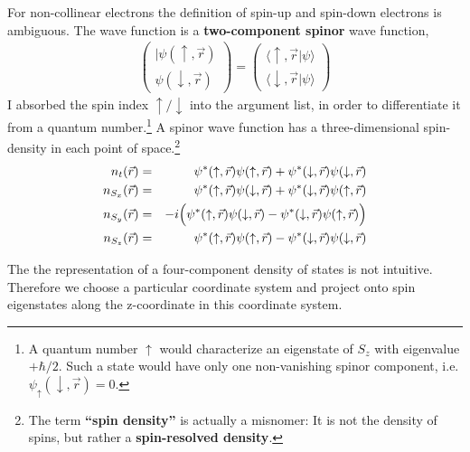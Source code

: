 \documentclass[final,12pt,makeidx,DIV=calc]{article}
\begin{document}
{{{{{{For non-collinear electrons the definition of spin-up and spin-down
electrons is ambiguous. The wave function is a \textbf{two-component
  spinor} wave function,
\begin{eqnarray}
\left(\begin{array}{c}|\psi(\uparrow,\vec{r})\\\psi(\downarrow,\vec{r})
\end{array}\right)
=\left(\begin{array}{c}\langle\uparrow,\vec{r}|\psi\rangle\\
\langle\downarrow,\vec{r}|\psi\rangle
\end{array}\right)
\end{eqnarray}
I absorbed the spin index $\uparrow/\downarrow$ into the argument
list, in order to differentiate it from a quantum number.\footnote{A
  quantum number $\uparrow$ would characterize an eigenstate of $S_z$
  with eigenvalue $+\hbar/2$. Such a state would have only one
  non-vanishing spinor component,
  i.e. $\psi_\uparrow(\downarrow,\vec{r})=0$.}  A spinor wave function
has a three-dimensional spin-density in each point of
space.\footnote{The term \textbf{``spin density''}
  is actually a misnomer: It is not the density of spins, but rather a
  \textbf{spin-resolved density}.}
\begin{eqnarray}
n_t(\vec{r})
&=&
\psi^*(\uparrow,\vec{r})\psi(\uparrow,\vec{r})  
+\psi^*(\downarrow,\vec{r})\psi(\downarrow,\vec{r})  
\nonumber\\
n_{S_x}(\vec{r})
&=&
\psi^*(\uparrow,\vec{r})\psi(\downarrow,\vec{r})  
+\psi^*(\downarrow,\vec{r})\psi(\uparrow,\vec{r})  
\nonumber\\
n_{S_y}(\vec{r})
&=&
-i\Bigl(
\psi^*(\uparrow,\vec{r})\psi(\downarrow,\vec{r})  
-\psi^*(\downarrow,\vec{r})\psi(\uparrow,\vec{r})  
\Bigr)
\nonumber\\
n_{S_z}(\vec{r})
&=&
\psi^*(\uparrow,\vec{r})\psi(\uparrow,\vec{r})  
-\psi^*(\downarrow,\vec{r})\psi(\downarrow,\vec{r})  
\nonumber\\
\end{eqnarray}

The the representation of a four-component density of states is not
intuitive. Therefore we choose a particular coordinate system and
project onto spin eigenstates along the z-coordinate in this
coordinate system.

}}}}}}
\end{document}
